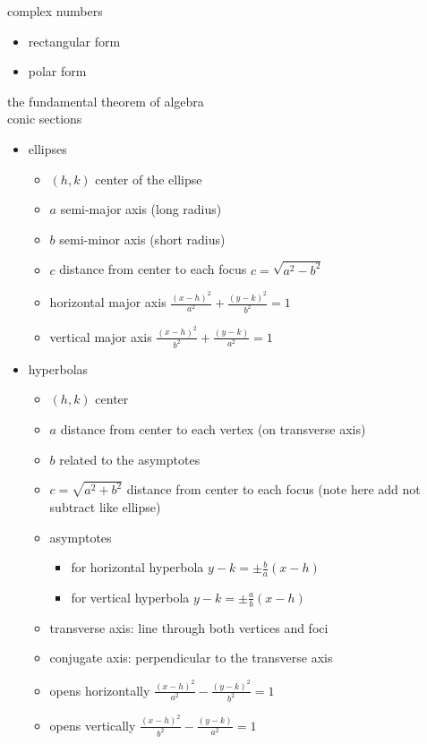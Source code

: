 \documentclass{article}
\begin{document}
complex numbers
	\begin{itemize}
		\item rectangular form
		\item polar form
	\end{itemize}

the fundamental theorem of algebra\\	

conic sections
	\begin{itemize}
		\item ellipses
			\begin{itemize}
				\item $(h, k)$ center of the ellipse
				\item $a$ semi-major axis (long radius)
				\item $b$ semi-minor axis (short radius)
				\item $c$ distance from center to each focus $c = \sqrt{a^2 - b^2}$
			\end{itemize}
			\begin{itemize}
				\item horizontal major axis $\frac{(x - h)^2}{a^2} + \frac{(y - k)^2}{b^2} = 1$
				\item vertical major axis $\frac{(x - h)^2}{b^2} + \frac{(y - k)}{a^2} = 1$
			\end{itemize}

		\item hyperbolas
			\begin{itemize}
				\item $(h, k)$ center
				\item $a$ distance from center to each vertex (on transverse axis) 
				\item $b$ related to the asymptotes
				\item $c = \sqrt{a^2 + b^2}$ distance from center to each focus (note here add not subtract like ellipse)
				\item asymptotes
					\begin{itemize}
						\item for horizontal hyperbola $y - k = \pm\frac{b}{a}(x - h)$
						\item for vertical hyperbola $y - k = \pm\frac{a}{b}(x - h)$
					\end{itemize}
				\item transverse axis: line through both vertices and foci
				\item conjugate axis: perpendicular to the transverse axis
			\end{itemize}
			\begin{itemize}
				\item opens horizontally $\frac{(x - h)^2}{a^2} - \frac{(y - k)^2}{b^2} = 1$  
				\item opens vertically $\frac{(x - h)^2}{b^2} - \frac{(y - k)}{a^2} = 1$ 
			\end{itemize}
	\end{itemize}
	
\end{document}
